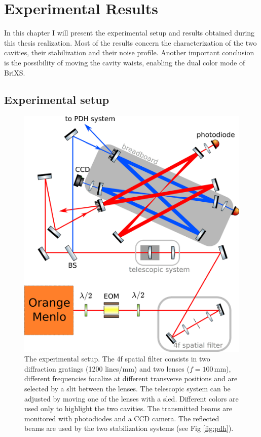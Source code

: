 \chapter{Experimental Results}

In this chapter I will present the experimental setup and results obtained during this thesis realization. Most of the results concern the characterization of the two cavities, their stabilization and their noise profile. Another important conclusion is the possibility of moving the cavity waists, enabling the dual color mode of BriXS. 

\section{Experimental setup}
\begin{figure}
	\centering
	\includegraphics[width=1\linewidth]{images/schema.eps}
	\caption{The experimental setup. The 4f spatial filter consists in two diffraction gratings (1200 lines/mm) and two lenses ($f=100$\,mm), different frequencies focalize at different transverse positions and are selected by a slit between the lenses. The telescopic system can be adjusted by moving one of the lenses with a sled. Different colors are used only to highlight the two cavities. The transmitted beams are monitored with photodiodes and a CCD camera. The reflected beams are used by the two stabilization systems (see Fig \ref{fig:pdh}).}
	\label{fig:schema}
\end{figure}
